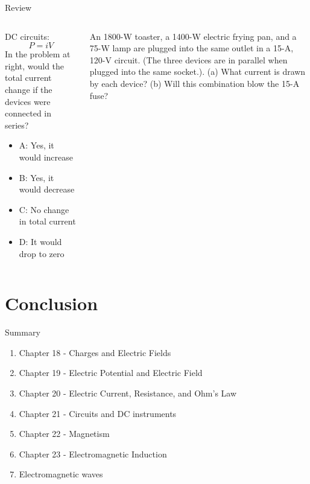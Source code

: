 \documentclass{beamer}
\begin{document}
\begin{frame}{Review}
\begin{columns}[T]
\begin{column}{0.45\textwidth}
\small
DC circuits:
\begin{equation}
P = i V
\end{equation}
In the problem at right, would the total current change if the devices were connected in series?
\begin{itemize}
\item A: Yes, it would increase
\item B: Yes, it would decrease
\item C: No change in total current
\item D: It would drop to zero
\end{itemize}
\end{column}
\begin{column}{0.65\textwidth}
An 1800-W toaster, a 1400-W electric frying pan, and a 75-W lamp are plugged into the same outlet in a 15-A, 120-V circuit. (The three devices are in parallel when plugged into the same socket.). (a) What current is drawn by each device? (b) Will this combination blow the 15-A fuse?
\end{column}
\end{columns}
\end{frame}

\section{Conclusion}

\begin{frame}{Summary}
\begin{enumerate}
\item Chapter 18 - Charges and Electric Fields
\item Chapter 19 - Electric Potential and Electric Field
\item Chapter 20 - Electric Current, Resistance, and Ohm's Law
\item Chapter 21 - Circuits and DC instruments
\item Chapter 22 - Magnetism
\item Chapter 23 - Electromagnetic Induction
\item Electromagnetic waves
\end{enumerate}
\end{frame}
\end{document}

